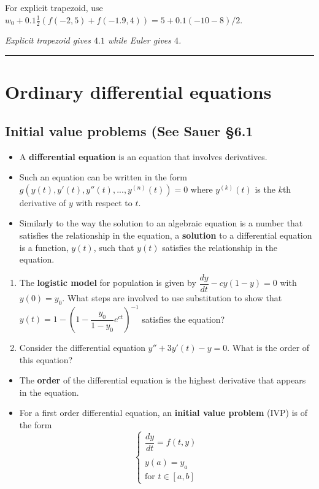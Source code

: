 \documentclass[12pt,letterpaper,noanswers]{exam}
\begin{document}
For explicit trapezoid, use $w_0 + 0.1 \frac{1}{2}(f(-2,5) +f(-1.9,4)) = 5+0.1(-10-8)/2$.

\emph{Explicit trapezoid gives $4.1$ while Euler gives $4$.}

\vspace{0.2cm}
\hrule
\vspace{0.2cm}



\section*{Ordinary differential equations}
\subsection*{Initial value problems (See Sauer \S 6.1}
\begin{tcolorbox}
\begin{itemize}
\itemsep0pt
    \item A \textbf{differential equation} is an equation that involves derivatives.
    \item Such an equation can be written in the form $g(y(t),y'(t),y''(t),...,y^{(n)}(t)) = 0$ where $y^{(k)}(t)$ is the $k$th derivative of $y$ with respect to $t$.  
    \item Similarly to the way the solution to an algebraic equation is a number that satisfies the relationship in the equation, a \textbf{solution} to a differential equation is a function, $y(t)$, such that $y(t)$ satisfies the relationship in the equation.
   
\end{itemize}
\end{tcolorbox}
\begin{enumerate}[resume=classQ]
\item The \textbf{logistic model} for population is given by $\dfrac{dy}{dt} - cy(1-y) = 0$ with  $y(0) = y_0$.  What steps are involved to use substitution to show that $y(t) = 1 - \left(1-\dfrac{y_0}{1-y_0}e^{ct}\right)^{-1}$ satisfies the equation?
\vspace{1in}
\item Consider the differential equation $y'' + 3y'(t) - y = 0$.  What is the order of this equation?
\vspace{1cm}
\end{enumerate}
\begin{tcolorbox}
\begin{itemize}
\itemsep0pt
     \item The \textbf{order} of the differential equation is the highest derivative that appears in the equation.
    \item For a first order differential equation, an \textbf{initial value problem} (IVP) is of the form \[\displaystyle\left\{\begin{array}{l}\dfrac{dy}{dt} = f(t,y) \\
    \\
y(a) = y_a \\ \text{for } t \in [a,b] \end{array}\right.\] 
\end{itemize}
\end{tcolorbox}
\end{document}
